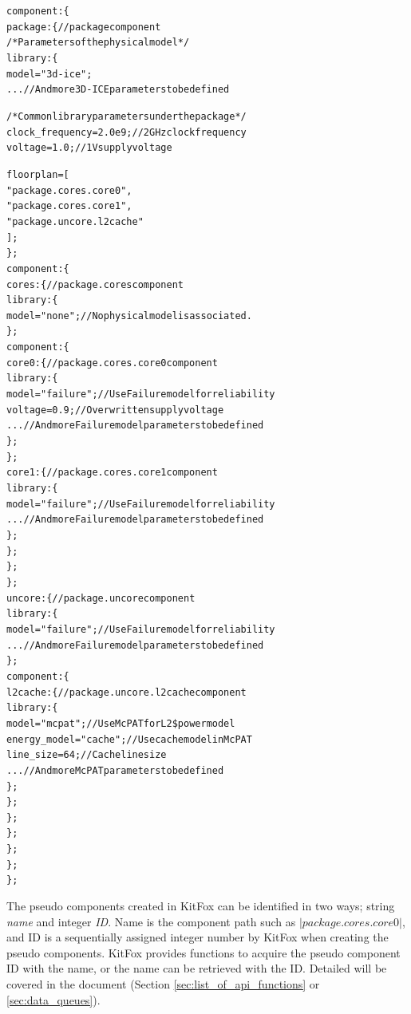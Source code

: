 {
\fontsize{10pt}{11pt}\selectfont
\begin{alltt}
component: \{
    package: \{ // package component
        /* Parameters of the physical model */
        library: \{
            model = "3d-ice";
            ... // And more 3D-ICE parameters to be defined
            
            /* Common library parameters under the package */
            clock_frequency = 2.0e9; // 2GHz clock frequency
            voltage = 1.0; // 1V supply voltage
            
            floorplan = [
                "package.cores.core0",
                "package.cores.core1",
                "package.uncore.l2cache"
            ];
        \};
        component: \{
           cores: \{ // package.cores component
                library: \{
                    model = "none"; // No physical model is associated.
                \};
                component: \{
                   core0: \{ // package.cores.core0 component 
                        library: \{
                            model = "failure"; // Use Failure model for reliability
                            voltage = 0.9; // Overwritten supply voltage
                            ... // And more Failure model parameters to be defined
                        \};
                    \};
                core1: \{ // package.cores.core1 component
                        library: \{
                            model = "failure"; // Use Failure model for reliability
                            ... // And more Failure model parameters to be defined
                        \};
                    \};
                \};
            \};
            uncore: \{ // package.uncore component
                library: \{
                    model = "failure"; // Use Failure model for reliability
                    ... // And more Failure model parameters to be defined
                \};
                component: \{
                   l2cache: \{ // package.uncore.l2cache component
                        library: \{
                            model = "mcpat"; // Use McPAT for L2\$ power model
                            energy_model = "cache"; // Use cache model in McPAT
                            line_size = 64; // Cache line size
                            ... // And more McPAT parameters to be defined
                        \};
                    \};
                \};
            \};
        \};
    \};
\};
\end{alltt}
}

\noindent
The pseudo components created in KitFox can be identified in two ways; string \emph{name} and integer \emph{ID}.
Name is the component path such as $|package.cores.core0|$, and ID is a sequentially assigned integer number by KitFox when creating the pseudo components.
KitFox provides functions to acquire the pseudo component ID with the name, or the name can be retrieved with the ID.
Detailed will be covered in the document (Section \ref{sec:list_of_api_functions} or \ref{sec:data_queues}).

